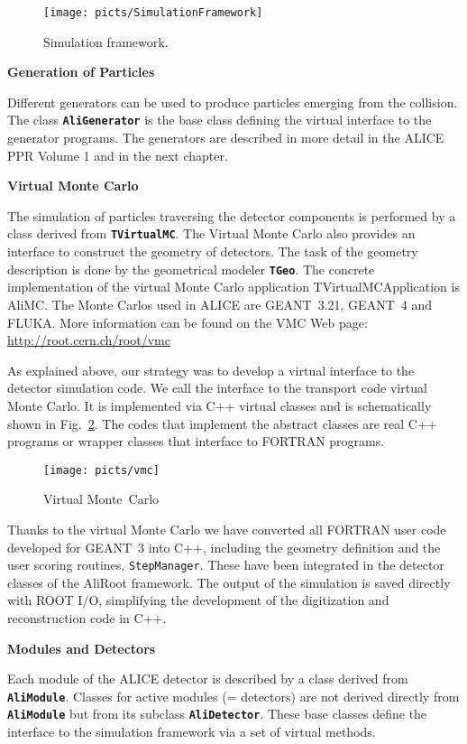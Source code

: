 \documentclass[12pt,a4paper,twoside]{article}
\makeatletter
\newcommand{\class}[1]{\texttt{\textbf{#1}}\xspace}
\newcommand {\MC} {Monte~Carlo\@\xspace}
\makeatother
\begin{document}
\begin{figure}[ht]
  \centering
  \texttt{[image: picts/SimulationFramework]}
  \caption{Simulation framework.} \label{MC:Simulation}
\end{figure}


\noindent
\textbf{Generation of Particles}

Different generators can be used to produce particles emerging from
the collision. The class \class{AliGenerator} is the base class
defining the virtual interface to the generator programs. The
generators are described in more detail in the ALICE PPR Volume 1 and
in the next chapter.

\noindent
\textbf{Virtual Monte Carlo}

The simulation of particles traversing the detector components is
performed by a class derived from \class{TVirtualMC}. The Virtual
Monte Carlo also provides an interface to construct the geometry of
detectors. The task of the geometry description is done by the
geometrical modeler \class{TGeo}. The concrete implementation of the
virtual Monte Carlo application TVirtualMCApplication is AliMC. The
Monte Carlos used in ALICE are GEANT~3.21, GEANT~4 and FLUKA. More
information can be found on the VMC Web page:
\url{http://root.cern.ch/root/vmc}

As explained above, our strategy was to develop a virtual interface to
the detector simulation code. We call the interface to the transport
code virtual Monte Carlo. It is implemented via C++ virtual classes
and is schematically shown in Fig.~\ref{MC:vmc}. The codes that
implement the abstract classes are real C++ programs or wrapper
classes that interface to FORTRAN programs.

\begin{figure}[ht]
  \centering
  \texttt{[image: picts/vmc]}
  \caption{Virtual \MC} \label{MC:vmc}
\end{figure}

Thanks to the virtual Monte Carlo we have converted all FORTRAN user
code developed for GEANT~3 into C++, including the geometry definition
and the user scoring routines, \texttt{StepManager}. These have been
integrated in the detector classes of the AliRoot framework. The
output of the simulation is saved directly with ROOT I/O, simplifying
the development of the digitization and reconstruction code in C++.

\noindent
\textbf{Modules and Detectors}

Each module of the ALICE detector is described by a class derived from
\class{AliModule}. Classes for active modules (= detectors) are not
derived directly from \class{AliModule} but from its subclass
\class{AliDetector}. These base classes define the interface to the
simulation framework via a set of virtual methods.
\end{document}
